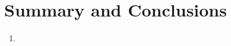 \chapter{\label{summary}Summary and Conclusions}
\begin{enumerate}
	\item 
\end{enumerate}

\setcounter{equation}{0}
\setcounter{table}{0}
\setcounter{figure}{0}


    



